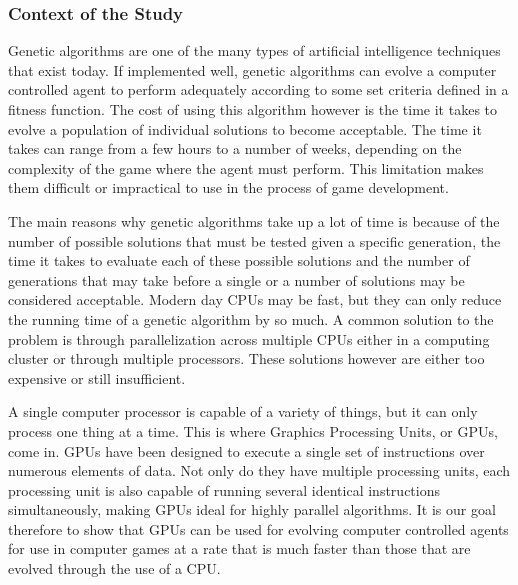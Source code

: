 \subsubsection*{Context of the Study}
Genetic algorithms are one of the many types of artificial intelligence
techniques that exist today. If implemented well, genetic algorithms can
evolve a computer controlled agent to perform adequately according to some
set criteria defined in a fitness function. The cost of using this algorithm
however is the time it takes to evolve a population of individual solutions
to become acceptable. The time it takes can range from a few hours to a number
of weeks, depending on the complexity of the game where the agent must perform.
This limitation makes them difficult or impractical to use in the process of
game development.


The main reasons why genetic algorithms take up a lot of time is because of the
number of possible solutions that must be tested given a specific generation,
the time it takes to evaluate each of these possible solutions and the number
of generations that may take before a single or a number of solutions may be
considered acceptable. Modern day CPUs may be fast, but they can only reduce
the running time of a genetic algorithm by so much. A common solution to the
problem is through parallelization across multiple CPUs either in a computing
cluster or through multiple processors. These solutions however are either
too expensive or still insufficient.


A single computer processor is capable of a variety of things, but it can only process
one thing at a time. This is where Graphics Processing Units, or GPUs, come in.
GPUs have been designed to execute a single set of instructions over numerous elements
of data. Not only do they have multiple processing units, each processing unit is also
capable of running several identical instructions simultaneously, making GPUs ideal
for highly parallel algorithms. It is our goal therefore to show that GPUs can be used
for evolving computer controlled agents for use in computer games at a rate that is much
faster than those that are evolved through the use of a CPU.